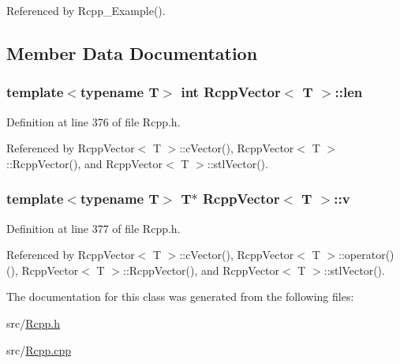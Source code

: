 Referenced by Rcpp\_\-Example().

\subsection{Member Data Documentation}
\hypertarget{classRcppVector_a733f5ed23ade0723338904f9f08457d6}{
\subsubsection[{len}]{\setlength{\rightskip}{0pt plus 5cm}template$<$typename T$>$ int {\bf RcppVector}$<$ T $>$::{\bf len}}}
\label{classRcppVector_a733f5ed23ade0723338904f9f08457d6}


Definition at line 376 of file Rcpp.h.

Referenced by RcppVector$<$ T $>$::cVector(), RcppVector$<$ T $>$::RcppVector(), and RcppVector$<$ T $>$::stlVector().\hypertarget{classRcppVector_ac810c53db4c1b978bada104b38484b26}{
\subsubsection[{v}]{\setlength{\rightskip}{0pt plus 5cm}template$<$typename T$>$ T$\ast$ {\bf RcppVector}$<$ T $>$::{\bf v}}}
\label{classRcppVector_ac810c53db4c1b978bada104b38484b26}


Definition at line 377 of file Rcpp.h.

Referenced by RcppVector$<$ T $>$::cVector(), RcppVector$<$ T $>$::operator()(), RcppVector$<$ T $>$::RcppVector(), and RcppVector$<$ T $>$::stlVector().

The documentation for this class was generated from the following files:\begin{DoxyCompactItemize}
\item 
src/\hyperlink{Rcpp_8h}{Rcpp.h}\item 
src/\hyperlink{Rcpp_8cpp}{Rcpp.cpp}\end{DoxyCompactItemize}
